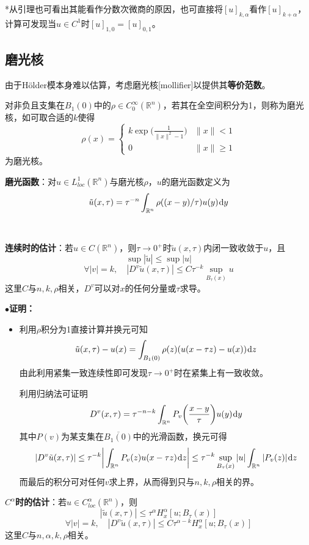 \documentclass[a4paper,UTF8,fontset=windows,AutoFakeBold]{ctexart}
\newcommand*{\dr}{\hspace{0.07em}\mathrm{d}}
\newcommand{\proo}[1]{{\kaishu $\bullet$\textbf{证明：}
\begin{itemize}
    \item[] #1
\end{itemize}
}}
\begin{document}
*从引理也可看出其能看作分数次微商的原因，也可直接将$[u]_{k,\alpha}$看作$[u]_{k+\alpha}$，计算可发现当$u\in C^1$时$[u]_{1,0}=[u]_{0,1}$。

\subsection{磨光核}
由于H\"older模本身难以估算，考虑磨光核[mollifier]以提供其\textbf{等价范数}。

对非负且支集在$B_1(0)$中的$\rho\in C_0^\infty(\mathbb{R}^n)$，若其在全空间积分为1，则称为磨光核，如可取合适的$k$使得
$$\rho(x)=\begin{cases}k\exp\big(\frac{1}{\|x\|^2-1}\big)&\|x\|<1\\0&\|x\|\ge 1\end{cases}$$
为磨光核。

\textbf{磨光函数}：对$u\in L_{loc}^1(\mathbb{R}^n)$与磨光核$\rho$，$u$的磨光函数定义为
$$\tilde{u}(x,\tau)=\tau^{-n}\int_{\mathbb{R}^n}\rho((x-y)/\tau)u(y)\dr y$$

\

\textbf{连续时的估计}：若$u\in C(\mathbb{R}^n)$，则$\tau\to0^+$时$\tilde{u}(x,\tau)$内闭一致收敛于$u$，且
$$\sup|\tilde{u}|\le\sup|u|$$
$$\forall|v|=k,\quad|D^v\tilde{u}(x,\tau)|\le C\tau^{-k}\sup_{B_\tau(x)}u$$
这里$C$与$n,k,\rho$相关，$D^v$可以对$x$的任何分量或$\tau$求导。

\proo{
    利用$\rho$积分为1直接计算并换元可知
    $$\tilde{u}(x,\tau)-u(x)=\int_{B_1(0)}\rho(z)(u(x-\tau z)-u(x))\dr z$$
    由此利用紧集一致连续性即可发现$\tau\to 0^+$时在紧集上有一致收敛。

    利用归纳法可证明
    $$D^v(x,\tau)=\tau^{-n-k}\int_{\mathbb{R}^n}P_v\bigg(\frac{x-y}{\tau}\bigg)u(y)\dr y$$
    其中$P(v)$为某支集在$\overline{B_1(0)}$中的光滑函数，换元可得
    $$|D^v\tilde{u}(x,\tau)|\le\tau^{-k}\bigg|\int_{\mathbb{R}^n}P_v(z)u(x-\tau z)\dr z\bigg|\le\tau^{-k}\sup_{B_\tau(x)}|u|\int_{\mathbb{R}^n}|P_v(z)|\dr z$$
    而最后的积分可对任何$v$求上界，从而得到只与$n,k,\rho$相关的界。
}

\textbf{$C^\alpha$时的估计}：若$u\in C_{loc}^\alpha(\mathbb{R}^n)$，则
$$|\tilde{u}(x,\tau)|\le\tau^\alpha H_x^\alpha[u;B_\tau(x)]$$
$$\forall|v|=k,\quad|D^v\tilde{u}(x,\tau)|\le C\tau^{\alpha-k}H_x^\alpha[u;B_\tau(x)]$$
这里$C$与$n,\alpha,k,\rho$相关。
\end{document}
